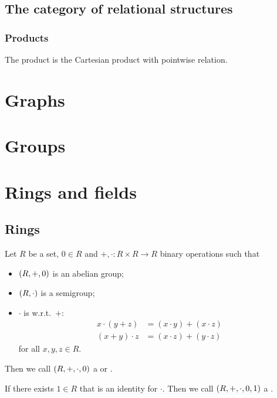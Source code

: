 \section{The category of relational structures}
\subsection{Products}
\begin{proposition}
The product is the Cartesian product with pointwise relation.
\end{proposition}

\chapter{Graphs}


\chapter{Groups}



\chapter{Rings and fields}
\section{Rings}
\begin{definition}
Let $R$ be a set, $0\in R$ and $+,\cdot: R\times R\to R$ binary operations such that
\begin{itemize}
\item $\left( R,+,0 \right)$ is an abelian group;
\item $\left( R,\cdot \right)$ is a semigroup;
\item $\cdot$ is  w.r.t.\ $+$:
\begin{align*}
x\cdot (y+z) &= (x\cdot y) + (x\cdot z) \\
(x+y)\cdot z &= (x\cdot z) + (y\cdot z)
\end{align*}
for all $x,y,z\in R$.
\end{itemize}
Then we call $\left( R, +,\cdot, 0 \right)$ a  or .

If there exists $1\in R$ that is an identity for $\cdot$. Then we call $\left( R,+,\cdot,0,1 \right)$ a .
\end{definition}

